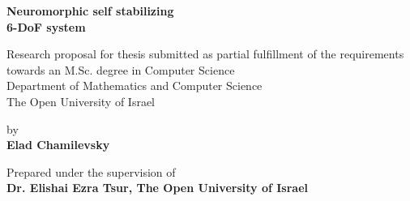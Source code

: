 \begin{titlepage}

 
\begin{center}

 \vspace{3cm}
\LARGE{\textbf{Neuromorphic self stabilizing \\6-DoF system\\}} \vspace{3cm}


\normalsize{Research proposal for thesis submitted as partial fulfillment of the requirements\\}
\normalsize{towards an M.Sc.  degree in Computer Science\\}
\normalsize{Department of Mathematics and Computer Science\\}
\small{The Open University of Israel\\}
\vspace{4cm}

\normalsize{by\\} \Large{\textbf{Elad Chamilevsky\\}} \vspace{3cm}


\normalsize{Prepared under the supervision of\\ \textbf{Dr. Elishai Ezra Tsur, The Open University of Israel\\}}


\newpage




\end{center}
\end{titlepage}